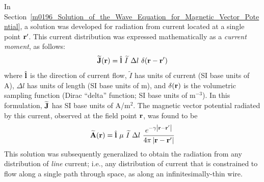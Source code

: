 

\label{m0221_Radiation_from_Surface_and_Volume_Current} %

In Section~\ref{m0196_Solution_of_the_Wave_Equation_for_Magnetic_Vector_Potential}, a solution was developed for radiation from current 
located at a single point ${\bf r}'$.  This current distribution was expressed mathematically as a \emph{current moment}, 
as follows:
%
\begin{equation}
\widetilde{\bf J}({\bf r}) = \hat{\bf l}~\widetilde{I}~\Delta l~\delta({\bf r}-{\bf r}')
\label{m0221_eCM}
\end{equation}
%
where 
$\hat{\bf l}$ is the direction of current flow,
$\widetilde{I}$ has units of current (SI base units of A),
$\Delta l$ has units of length (SI base units of m),
and $\delta({\bf r})$ is the volumetric sampling function (Dirac ``delta'' function; SI base units of m$^{-3}$).
In this formulation, $\widetilde{\bf J}$ has SI base units of A/m$^2$.
%
The magnetic vector potential radiated by this current, observed at the field point ${\bf r}$, was found to be
%
\begin{equation}
\widetilde{\bf A}({\bf r}) = \hat{\bf l}~\mu~\widetilde{I}~\Delta l~\frac{e^{-\gamma \left|{\bf r}-{\bf r}'\right|}}{4\pi \left|{\bf r}-{\bf r}'\right|}
\label{m0221_eA}
\end{equation}
%
This solution was subsequently generalized to obtain the radiation from any distribution of \emph{line} current; i.e., any distribution of current that is constrained to flow along a single path through space, as along an infinitesimally-thin wire.

